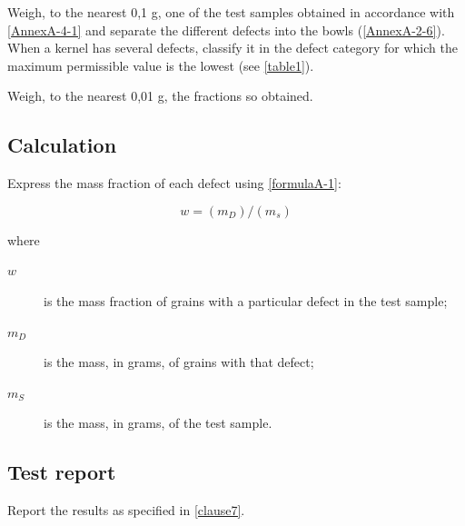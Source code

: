 Weigh, to the nearest 0,1 g, one of the test samples obtained in accordance with \ref{AnnexA-4-1} and separate the different defects into the bowls (\ref{AnnexA-2-6}). When a kernel has several defects, classify it in the defect category for which the maximum permissible value is the lowest (see \ref{table1}).

Weigh, to the nearest 0,01 g, the fractions so obtained.

\subsection{Calculation}

Express the mass fraction of each defect using \ref{formulaA-1}:

\begin{equation}\label{formulaA-1}
  w = (m_D) / (m_s)
\end{equation}

where

\begin{description}
  \item[$w$] is the mass fraction of grains with a particular defect in the test sample;
  \item[$m_D$] is the mass, in grams, of grains with that defect;
  \item[$m_S$] is the mass, in grams, of the test sample.
\end{description}

\subsection{Test report}

Report the results as specified in \ref{clause7}.
